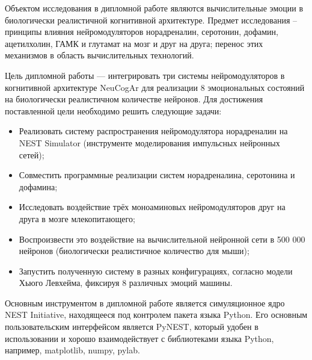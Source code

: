 Объектом исследования в дипломной работе являются вычислительные эмоции в биологически реалистичной когнитивной архитектуре. Предмет исследования – принципы влияния нейромодуляторов норадреналин, серотонин, дофамин, ацетилхолин, ГАМК и глутамат на мозг и друг на друга; перенос этих механизмов в область вычислительных технологий.

Цель дипломной работы — интегрировать три системы нейромодуляторов в когнитивной архитектуре NeuCogAr для реализации 8 эмоциональных состояний на биологически реалистичном количестве нейронов. Для достижения поставленной цели необходимо решить следующие задачи:
\begin{itemize}
\item Реализовать систему распространения нейромодулятора норадреналин на NEST Simulator (инструменте моделирования импульсных нейронных сетей);
\item Совместить программные реализации систем норадреналина, серотонина и дофамина;
\item Исследовать воздействие трёх моноаминовых нейромодуляторов друг на друга в мозге млекопитающего;
\item Воспроизвести это воздействие на вычислительной нейронной сети в 500 000 нейронов (биологически реалистичное количество для мыши);
\item Запустить полученную систему в разных конфигурациях, согласно модели Хьюго Левхейма, фиксируя 8 различных эмоций машины.
\end{itemize}

Основным инструментом в дипломной работе является симуляционное ядро NEST Initiative, находящееся под контролем пакета языка Python. Его основным пользовательским интерфейсом является PyNEST, который удобен в использовании и хорошо взаимодействует с библиотеками языка Python, например, matplotlib, numpy, pylab.
